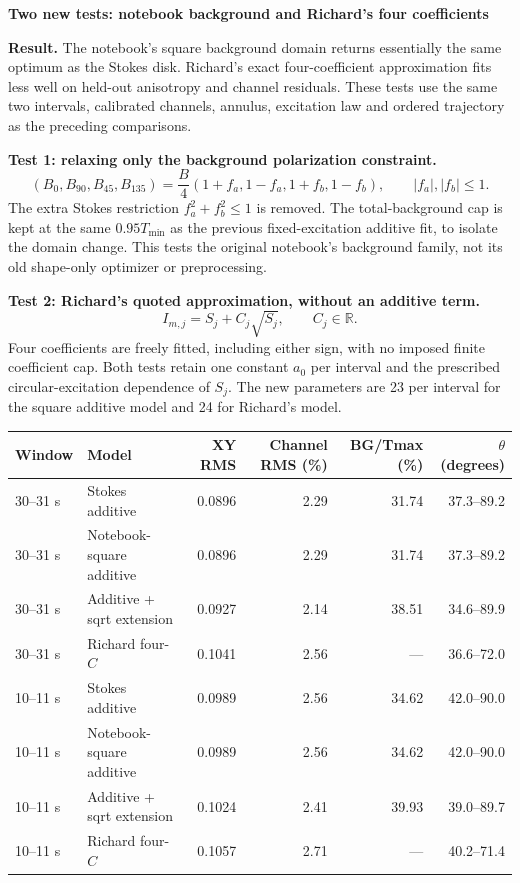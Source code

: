 \documentclass[11pt,a4paper]{article}
\begin{document}
{\LARGE\bfseries Two new tests: notebook background and Richard's four coefficients}\par
\textbf{Result.} The notebook's square background domain returns essentially the same optimum as the Stokes disk. Richard's exact four-coefficient approximation fits less well on held-out anisotropy and channel residuals. These tests use the same two intervals, calibrated channels, annulus, excitation law and ordered trajectory as the preceding comparisons.

\textbf{Test 1: relaxing only the background polarization constraint.}
\[
(B_0,B_{90},B_{45},B_{135})=\frac{B}{4}(1+f_a,1-f_a,1+f_b,1-f_b),
\qquad |f_a|,|f_b|\leq1.
\]
The extra Stokes restriction $f_a^2+f_b^2\leq1$ is removed. The total-background cap is kept at the same $0.95T_{\min}$ as the previous fixed-excitation additive fit, to isolate the domain change. This tests the original notebook's background family, not its old shape-only optimizer or preprocessing.

\textbf{Test 2: Richard's quoted approximation, without an additive term.}
\[
I_{m,j}=S_j+C_j\sqrt{S_j},\qquad C_j\in\mathbb R.
\]
Four coefficients are freely fitted, including either sign, with no imposed finite coefficient cap. Both tests retain one constant $a_0$ per interval and the prescribed circular-excitation dependence of $S_j$. The new parameters are 23 per interval for the square additive model and 24 for Richard's model.

{\small\begin{tabular}{llrrrr}\toprule
Window & Model & XY RMS & Channel RMS (\%) & BG/Tmax (\%) & $\theta$ (degrees)\\\midrule
30--31 s & Stokes additive & 0.0896 & 2.29 & 31.74 & 37.3--89.2 \\
30--31 s & Notebook-square additive & 0.0896 & 2.29 & 31.74 & 37.3--89.2 \\
30--31 s & Additive + sqrt extension & 0.0927 & 2.14 & 38.51 & 34.6--89.9 \\
30--31 s & Richard four-$C$ & 0.1041 & 2.56 & --- & 36.6--72.0 \\
10--11 s & Stokes additive & 0.0989 & 2.56 & 34.62 & 42.0--90.0 \\
10--11 s & Notebook-square additive & 0.0989 & 2.56 & 34.62 & 42.0--90.0 \\
10--11 s & Additive + sqrt extension & 0.1024 & 2.41 & 39.93 & 39.0--89.7 \\
10--11 s & Richard four-$C$ & 0.1057 & 2.71 & --- & 40.2--71.4 \\
\bottomrule\end{tabular}}
\end{document}
